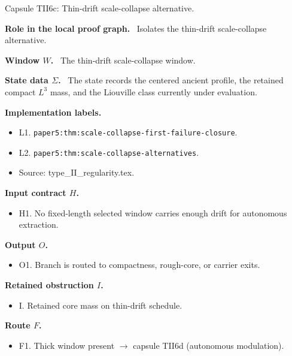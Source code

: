 \documentclass[11pt]{amsart}
\newcommand{\capsulefield}[1]{\par\smallskip\noindent\textbf{#1.}\ }
\begin{document}
\begin{proofcapsule}{Capsule TII6c: Thin-drift scale-collapse alternative.}
  \capsulefield{Role in the local proof graph}
  Isolates the thin-drift scale-collapse alternative.

  \capsulefield{Window \(W\)}
The thin-drift scale-collapse window.

  \capsulefield{State data \(\Sigma\)}
The state records the centered ancient profile, the retained compact $L^3$ mass, and the Liouville class currently under evaluation.

  \capsulefield{Implementation labels}
  \begin{itemize}[leftmargin=1.8em]
  \item L1. \texttt{paper5:thm:scale-collapse-first-failure-closure}.
  \item L2. \texttt{paper5:thm:scale-collapse-alternatives}.
  \item Source: type\_II\_regularity.tex.
  \end{itemize}

  \capsulefield{Input contract \(H\)}
  \begin{itemize}[leftmargin=1.8em]
  \item H1. No fixed-length selected window carries enough drift for autonomous extraction.
  \end{itemize}

  \capsulefield{Output \(O\)}
  \begin{itemize}[leftmargin=1.8em]
  \item O1. Branch is routed to compactness, rough-core, or carrier exits.
  \end{itemize}

  \capsulefield{Retained obstruction \(I\)}
  \begin{itemize}[leftmargin=1.8em]
  \item I. Retained core mass on thin-drift schedule.
  \end{itemize}

  \capsulefield{Route \(F\)}
  \begin{itemize}[leftmargin=1.8em]
  \item F1. Thick window present $\to$ capsule TII6d (autonomous modulation).
  \end{itemize}


\end{proofcapsule}
\end{document}
